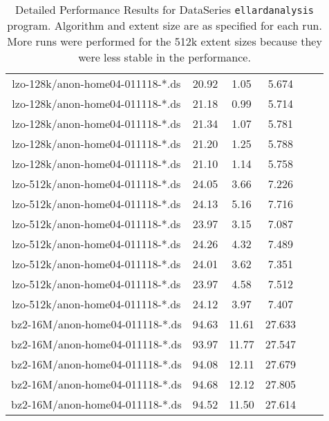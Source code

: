 \documentclass{article}
\begin{document}
\begin{table}
\begin{tabular}{|c|c|c|c|c|c|}
lzo-128k/anon-home04-011118-*.ds & 20.92 & 1.05 & 5.674 \\
lzo-128k/anon-home04-011118-*.ds & 21.18 & 0.99 & 5.714 \\
lzo-128k/anon-home04-011118-*.ds & 21.34 & 1.07 & 5.781 \\
lzo-128k/anon-home04-011118-*.ds & 21.20 & 1.25 & 5.788 \\
lzo-128k/anon-home04-011118-*.ds & 21.10 & 1.14 & 5.758 \\

lzo-512k/anon-home04-011118-*.ds & 24.05 & 3.66 & 7.226 \\
lzo-512k/anon-home04-011118-*.ds & 24.13 & 5.16 & 7.716 \\
lzo-512k/anon-home04-011118-*.ds & 23.97 & 3.15 & 7.087 \\
lzo-512k/anon-home04-011118-*.ds & 24.26 & 4.32 & 7.489 \\
lzo-512k/anon-home04-011118-*.ds & 24.01 & 3.62 & 7.351 \\
lzo-512k/anon-home04-011118-*.ds & 23.97 & 4.58 & 7.512 \\
lzo-512k/anon-home04-011118-*.ds & 24.12 & 3.97 & 7.407 \\

bz2-16M/anon-home04-011118-*.ds & 94.63 & 11.61 & 27.633 \\
bz2-16M/anon-home04-011118-*.ds & 93.97 & 11.77 & 27.547 \\
bz2-16M/anon-home04-011118-*.ds & 94.08 & 12.11 & 27.679 \\
bz2-16M/anon-home04-011118-*.ds & 94.68 & 12.12 & 27.805 \\
bz2-16M/anon-home04-011118-*.ds & 94.52 & 11.50 & 27.614 \\ 
\hline
\end{tabular}
\label{tab:dataseries}

\caption{Detailed Performance Results for DataSeries
\texttt{ellardanalysis} program.  Algorithm and extent size are as
specified for each run.  More runs were performed for the 512k extent
sizes because they were less stable in the performance.}

\end{table}
\end{document}
